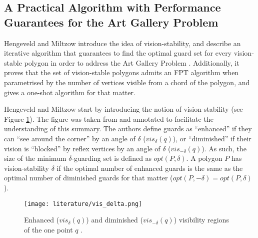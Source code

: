 \subsection[An Algorithm with Performance Guarantees]{A Practical Algorithm with Performance Guarantees for the Art Gallery Problem}
Hengeveld and Miltzow \cite{DBLP:journals/corr/abs-2007-06920} introduce the idea of vision-stability, and describe an iterative algorithm that guarantees to find the optimal guard set for every vision-stable polygon in order to address the Art Gallery Problem \cite{o1987art}. Additionally, it proves that the set of vision-stable polygons admits an FPT algorithm when parametrised by the number of vertices visible from a chord of the polygon, and gives a one-shot algorithm for that matter.

Hengeveld and Miltzow \cite{DBLP:journals/corr/abs-2007-06920} start by introducing the notion of vision-stability (see Figure \ref{fig:vis}). The figure was taken from \cite{DBLP:journals/corr/abs-2007-06920} and annotated to facilitate the understanding of this summary. The authors define guards as ``enhanced'' if they can ``see around the corner'' by an angle of $\delta$ ($vis_\delta(q)$), or ``diminished'' if their vision is ``blocked'' by reflex vertices by an angle of $\delta$ ($vis_{-\delta}(q)$). As such, the size of the minimum $\delta$-guarding set is defined as $opt(P, \delta)$. A polygon $P$ has vision-stability $\delta$ if the optimal number of enhanced guards is the same as the optimal number of diminished guards for that matter ($opt(P, -\delta) = opt(P, \delta)$). 

\begin{figure}[h!]
    \centering
    \texttt{[image: literature/vis\_delta.png]}
    \caption{Enhanced ($vis_\delta(q)$) and diminished ($vis_{-\delta}(q)$) visibility regions of the one point $q$ \cite{DBLP:journals/corr/abs-2007-06920}.}
    \label{fig:vis}
\end{figure}

